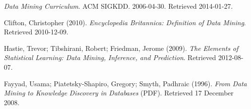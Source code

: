 \begin{thebibliography}{X}

 \textit{Data Mining Curriculum}. ACM SIGKDD. 2006-04-30. Retrieved 2014-01-27.

 Clifton, Christopher (2010). \textit{Encyclopedia Britannica: Definition of Data Mining}. Retrieved 2010-12-09.

 Hastie, Trevor; Tibshirani, Robert; Friedman, Jerome (2009). \textit{The Elements of Statistical Learning: Data Mining, Inference, and Prediction}. Retrieved 2012-08-07.

 Fayyad, Usama; Piatetsky-Shapiro, Gregory; Smyth, Padhraic (1996). \textit{From Data Mining to Knowledge Discovery in Databases} (PDF). Retrieved 17 December 2008.

\end{thebibliography}